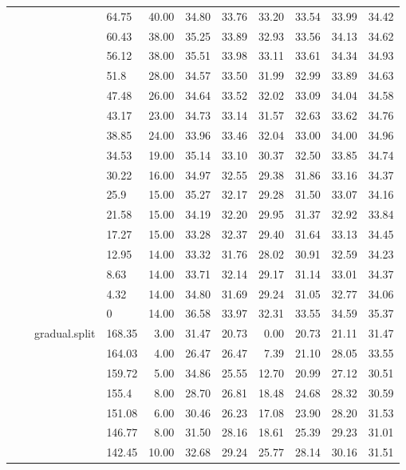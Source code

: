 \begin{longtable}{llllrrrrrrr}
   &  &  & 64.75 & 40.00 & 34.80 & 33.76 & 33.20 & 33.54 & 33.99 & 34.42 \\ 
   &  &  & 60.43 & 38.00 & 35.25 & 33.89 & 32.93 & 33.56 & 34.13 & 34.62 \\ 
   &  &  & 56.12 & 38.00 & 35.51 & 33.98 & 33.11 & 33.61 & 34.34 & 34.93 \\ 
   &  &  & 51.8 & 28.00 & 34.57 & 33.50 & 31.99 & 32.99 & 33.89 & 34.63 \\ 
   &  &  & 47.48 & 26.00 & 34.64 & 33.52 & 32.02 & 33.09 & 34.04 & 34.58 \\ 
   &  &  & 43.17 & 23.00 & 34.73 & 33.14 & 31.57 & 32.63 & 33.62 & 34.76 \\ 
   &  &  & 38.85 & 24.00 & 33.96 & 33.46 & 32.04 & 33.00 & 34.00 & 34.96 \\ 
   &  &  & 34.53 & 19.00 & 35.14 & 33.10 & 30.37 & 32.50 & 33.85 & 34.74 \\ 
   &  &  & 30.22 & 16.00 & 34.97 & 32.55 & 29.38 & 31.86 & 33.16 & 34.37 \\ 
   &  &  & 25.9 & 15.00 & 35.27 & 32.17 & 29.28 & 31.50 & 33.07 & 34.16 \\ 
   &  &  & 21.58 & 15.00 & 34.19 & 32.20 & 29.95 & 31.37 & 32.92 & 33.84 \\ 
   &  &  & 17.27 & 15.00 & 33.28 & 32.37 & 29.40 & 31.64 & 33.13 & 34.45 \\ 
   &  &  & 12.95 & 14.00 & 33.32 & 31.76 & 28.02 & 30.91 & 32.59 & 34.23 \\ 
   &  &  & 8.63 & 14.00 & 33.71 & 32.14 & 29.17 & 31.14 & 33.01 & 34.37 \\ 
   &  &  & 4.32 & 14.00 & 34.80 & 31.69 & 29.24 & 31.05 & 32.77 & 34.06 \\ 
   &  &  & 0 & 14.00 & 36.58 & 33.97 & 32.31 & 33.55 & 34.59 & 35.37 \\ 
   &  & gradual.split & 168.35 & 3.00 & 31.47 & 20.73 & 0.00 & 20.73 & 21.11 & 31.47 \\ 
   &  &  & 164.03 & 4.00 & 26.47 & 26.47 & 7.39 & 21.10 & 28.05 & 33.55 \\ 
   &  &  & 159.72 & 5.00 & 34.86 & 25.55 & 12.70 & 20.99 & 27.12 & 30.51 \\ 
   &  &  & 155.4 & 8.00 & 28.70 & 26.81 & 18.48 & 24.68 & 28.32 & 30.59 \\ 
   &  &  & 151.08 & 6.00 & 30.46 & 26.23 & 17.08 & 23.90 & 28.20 & 31.53 \\ 
   &  &  & 146.77 & 8.00 & 31.50 & 28.16 & 18.61 & 25.39 & 29.23 & 31.01 \\ 
   &  &  & 142.45 & 10.00 & 32.68 & 29.24 & 25.77 & 28.14 & 30.16 & 31.51 \\ 

\end{longtable}
